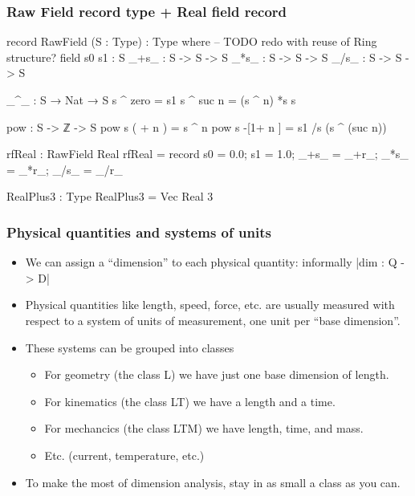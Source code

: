 \documentclass[aspectratio=169]{beamer}
\begin{document}
\begin{frame}
\subsubsection{Raw Field record type + Real field record}
\begin{code}
record RawField (S : Type) : Type where
  -- TODO redo with reuse of Ring structure?
  field
    s0 s1 : S
    _+s_ : S -> S -> S
    _*s_ : S -> S -> S
    _/s_ : S -> S -> S

  _^_ : S → Nat → S
  s ^ zero   = s1
  s ^ suc n  = (s ^ n) *s s

  pow : S -> ℤ -> S
  pow s  ( + n )  =        s ^ n
  pow s -[1+ n ]  = s1 /s (s ^ (suc n))

rfReal : RawField Real
rfReal = record {s0 = 0.0; s1 = 1.0; _+s_ = _+r_; _*s_ = _*r_; _/s_ = _/r_}

RealPlus3 : Type
RealPlus3 = Vec Real 3
\end{code}
\end{frame}
\begin{frame}
  \frametitle{Physical quantities and systems of units}
\begin{itemize}
\item We can assign a ``dimension'' to each physical quantity:
informally |dim : Q -> D|
\item Physical quantities like length, speed, force, etc. are usually
measured with respect to a system of units of measurement, one unit
per ``base dimension''.

\pause
\item These systems can be grouped into classes
\begin{itemize}
\item For geometry (the class L) we have just one base dimension of length.
\item For kinematics (the class LT) we have a length and a time.
\item For mechancics (the class LTM) we have length, time, and mass.
\item Etc. (current, temperature, etc.)
\end{itemize}
\pause
\item To make the most of dimension analysis, stay in as small a class as you can.
\end{itemize}
\end{frame}
\end{document}
